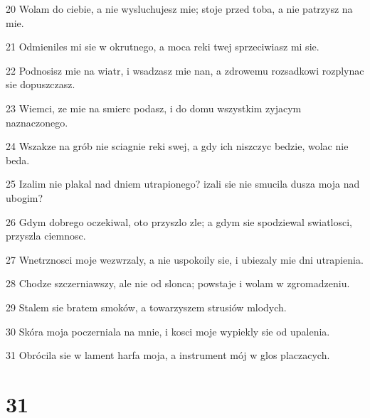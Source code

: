 \par 20 Wolam do ciebie, a nie wysluchujesz mie; stoje przed toba, a nie patrzysz na mie.
\par 21 Odmieniles mi sie w okrutnego, a moca reki twej sprzeciwiasz mi sie.
\par 22 Podnosisz mie na wiatr, i wsadzasz mie nan, a zdrowemu rozsadkowi rozplynac sie dopuszczasz.
\par 23 Wiemci, ze mie na smierc podasz, i do domu wszystkim zyjacym naznaczonego.
\par 24 Wszakze na grób nie sciagnie reki swej, a gdy ich niszczyc bedzie, wolac nie beda.
\par 25 Izalim nie plakal nad dniem utrapionego? izali sie nie smucila dusza moja nad ubogim?
\par 26 Gdym dobrego oczekiwal, oto przyszlo zle; a gdym sie spodziewal swiatlosci, przyszla ciemnosc.
\par 27 Wnetrznosci moje wezwrzaly, a nie uspokoily sie, i ubiezaly mie dni utrapienia.
\par 28 Chodze szczerniawszy, ale nie od slonca; powstaje i wolam w zgromadzeniu.
\par 29 Stalem sie bratem smoków, a towarzyszem strusiów mlodych.
\par 30 Skóra moja poczerniala na mnie, i kosci moje wypiekly sie od upalenia.
\par 31 Obrócila sie w lament harfa moja, a instrument mój w glos placzacych.

\chapter{31}

